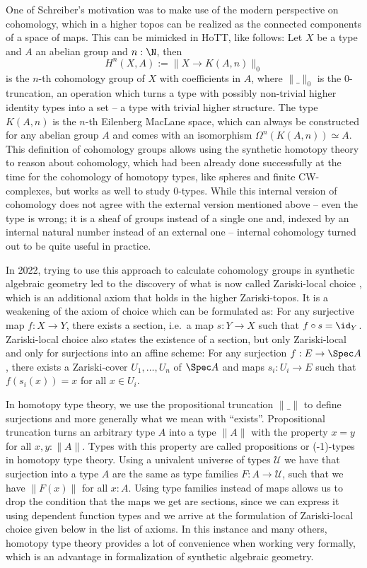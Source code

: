 One of Schreiber's motivation was to make use of the modern perspective on cohomology, which in a higher topos can be realized as the connected components of a space of maps. This can be mimicked in HoTT, like follows: Let $X$ be a type and $A$ an abelian group and $n:\N$, then
\[ H^n(X,A):=\| X\to K(A,n) \|_0\]
is the $n$-th cohomology group of $X$ with coefficients in $A$, where $\|\_\|_0$ is the $0$-truncation, an operation which turns a type with possibly non-trivial higher identity types into a set -- a type with trivial higher structure. The type $K(A,n)$ is the $n$-th Eilenberg MacLane space, which can always be constructed for any abelian group $A$ and comes with an isomorphism $\Omega^n(K(A,n))\simeq A$.
This definition of cohomology groups allows using the synthetic homotopy theory to reason about cohomology, which had been already done successfully at the time for the cohomology of homotopy types, like spheres and finite CW-complexes, but works as well to study $0$-types.
While this internal version of cohomology does not agree with the external version mentioned above --
even the type is wrong; it is a sheaf of groups instead of a single one and, indexed by an internal natural number instead of an external one -- internal cohomology turned out to be quite useful in practice.

In 2022, trying to use this approach to calculate cohomology groups in synthetic algebraic geometry led to the discovery of what is now called Zariski-local choice \cite{draft},
which is an additional axiom that holds in the higher Zariski-topos.
It is a weakening of the axiom of choice which can be formulated as: For any surjective map $f:X\to Y$, there exists a section, i.e.\ a map $s:Y\to X$ such that $f\circ s=\id_Y$.
Zariski-local choice also states the existence of a section, but only Zariski-local and only for surjections into an affine scheme: For any surjection $f:E\to \Spec A$,
there exists a Zariski-cover $U_1,\dots,U_n$ of $\Spec A$ and maps $s_i:U_i\to E$ such that $f(s_i(x))=x$ for all $x\in U_i$.

In homotopy type theory, we use the propositional truncation $\|\_\|$ to define surjections and more generally what we mean with ``exists''.
Propositional truncation turns an arbitrary type $A$ into a type $\|A\|$ with the property $x=y$ for all $x,y:\|A\|$.
Types with this property are called propositions or (-1)-types in homotopy type theory.
Using a univalent universe of types $\mathcal U$ we have that surjection into a type $A$ are the same as type families $F:A\to \mathcal U$, such that we have $\|F(x)\|$ for all $x: A$.
Using type families instead of maps allows us to drop the condition that the maps we get are sections, since we can express it using dependent function types and we arrive at the formulation of Zariski-local choice given below in the list of axioms.
In this instance and many others, homotopy type theory provides a lot of convenience when working very formally, which is an advantage in formalization of synthetic algebraic geometry.

